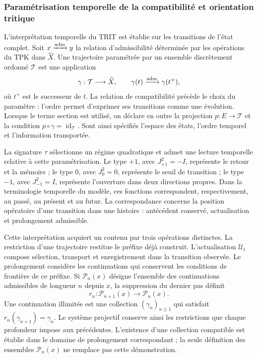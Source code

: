 \subsubsection{Paramétrisation temporelle de la compatibilité et orientation tritique}
\label{trit-temporal-compatibilidad}

L’interprétation temporelle du TRIT est établie sur les transitions de
l’état complet. Soit \(x\xrightarrow{\rm adm}y\) la relation d’admissibilité déterminée
par les opérations du TPK dans \(\widehat X\). Une trajectoire paramétrée
par un ensemble discrètement ordonné \(\mathcal T\) est une application
\[
 \gamma:\mathcal T\longrightarrow\widehat X,\qquad
 \gamma(t)\xrightarrow{\rm adm}\gamma(t^+),
\]
où \(t^+\) est le successeur de \(t\). La relation de compatibilité précède
le choix du paramètre : l’ordre permet d’exprimer ses transitions comme
une évolution. Lorsque le terme section est utilisé, on déclare en outre la
projection \(p:E\to\mathcal T\) et la condition
\(p\circ\gamma=\operatorname{id}_{\mathcal T}\). Sont ainsi spécifiés
l’espace des états, l’ordre temporel et l’information transportée.

La signature \(\tau\) sélectionne un régime quadratique et admet une lecture
temporelle relative à cette paramétrisation. Le type \(+1\), avec
\(J_{+1}^{2}=-I\), représente le retour et la mémoire ; le type \(0\), avec
\(J_0^{2}=0\), représente le seuil de transition ; le type \(-1\), avec
\(J_{-1}^{2}=I\), représente l’ouverture dans deux directions propres. Dans la
terminologie temporelle du modèle, ces fonctions correspondent,
respectivement, au passé, au présent et au futur. La correspondance concerne
la position opératoire d’une transition dans une histoire :
antécédent conservé, actualisation et prolongement admissible.

Cette interprétation acquiert un contenu par trois opérations distinctes.
La restriction d’une trajectoire restitue le préfixe déjà construit.
L’actualisation \(\mathcal U_t\) compose sélection, transport et enregistrement dans
la transition observée. Le prolongement considère les continuations qui
conservent les conditions de frontière de ce préfixe. Si
\(\mathcal P_n(x)\) désigne l’ensemble des continuations admissibles de
longueur \(n\) depuis \(x\), la suppression du dernier pas définit
\[
 r_n:\mathcal P_{n+1}(x)\longrightarrow\mathcal P_n(x).
\]
Une continuation illimitée est une collection \((\gamma_n)_{n\geq1}\) qui
satisfait \(r_n(\gamma_{n+1})=\gamma_n\). Le système projectif conserve
ainsi les restrictions que chaque profondeur impose aux
précédentes. L'existence d'une collection compatible est établie dans le
domaine de prolongement correspondant ; la seule définition des
ensembles \(\mathcal P_n(x)\) ne remplace pas cette démonstration.

